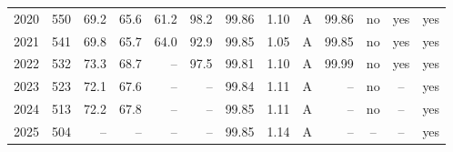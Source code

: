 {\begin{tabular}{lrrrrrrrcrccc}
2020 & 550 & 69.2 & 65.6 & 61.2 & 98.2 & 99.86 & 1.10 & A & 99.86 & no & yes & yes \\
2021 & 541 & 69.8 & 65.7 & 64.0 & 92.9 & 99.85 & 1.05 & A & 99.85 & no & yes & yes \\
2022 & 532 & 73.3 & 68.7 & -- & 97.5 & 99.81 & 1.10 & A & 99.99 & no & yes & yes \\
2023 & 523 & 72.1 & 67.6 & -- & -- & 99.84 & 1.11 & A & -- & no & -- & yes \\
2024 & 513 & 72.2 & 67.8 & -- & -- & 99.85 & 1.11 & A & -- & no & -- & yes \\
2025 & 504 & -- & -- & -- & -- & 99.85 & 1.14 & A & -- & -- & -- & yes \\
\bottomrule
\end{tabular}}
